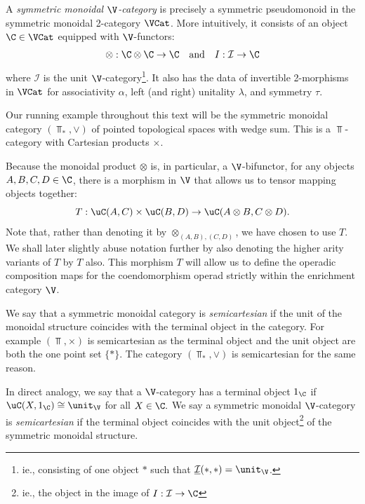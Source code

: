 \documentclass{tac}
\def\bTop{{\Top_\ast}}
\begin{document}
\begin{definition}
A \emph{symmetric monoidal $\V$-category} is precisely a symmetric pseudomonoid in the symmetric monoidal 2-category $\VCat$.  More intuitively,  it consists of an object $\C \in \VCat$ equipped with $\V$-functors:
$$ \otimes: \C \otimes \C \to \C \quad \text{and} \quad I: \mathcal{I} \to \C $$
where $\mathcal{I}$ is the unit $\V$-category\footnote{ie., consisting of one object $\ast$ such that $\underline{\mathcal{I}}(\ast, \ast) = \unit_{\V}$.}. It also has the data of invertible 2-morphisms in $\VCat$ for associativity $\alpha$, left (and right)  unitality $\lambda$, and symmetry $\tau$.

\end{definition}
\begin{example}
Our running example throughout this text will be the symmetric monoidal category $(\bTop, \vee)$ of pointed topological spaces with wedge sum. This is a $\Top$-category with Cartesian products $\times$.
\end{example}
Because the monoidal product $\otimes$ is, in particular, a $\V$-bifunctor, for any objects $A, B, C, D \in \C$, there is a morphism in $\V$ that allows us to tensor mapping objects together:
$$ T: \uC(A, C) \times \uC(B, D) \to \uC(A \otimes B, C \otimes D). $$
Note that, rather than denoting it by $\otimes_{(A, B), (C, D)}$, we have chosen to use $T$.  We shall later slightly abuse notation further by also denoting the higher arity variants of $T$ by $T$ also. This morphism $T$ will allow us to define the operadic composition maps for the coendomorphism operad strictly within the enrichment category $\V$.

We say that a symmetric monoidal category is \emph{semicartesian} if the unit of the monoidal structure coincides with the terminal object in the category. For example $(\Top, \times)$ is semicartesian as the terminal object and the unit object are both the one point set $\{\ast\}$. The category $(\bTop, \vee)$ is semicartesian for the same reason. 

In direct analogy, we say that a $\V$-category has a terminal object $1_{\C}$ if $\uC(X, 1_{\C}) \cong \unit_{\V}$ for all $X \in\C.$ We say a symmetric monoidal $\V$-category is \emph{semicartesian} if the terminal object coincides with the unit object\footnote{ie., the object in the image of $I: \mathcal I \to \C$} of the symmetric monoidal structure.

\medskip
\end{document}
